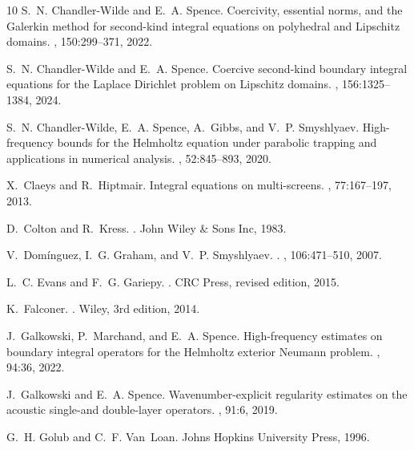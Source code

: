 \documentclass{birkjour}
\theoremstyle{definition}
\theoremstyle{remark}
\numberwithin{equation}{section}
\begin{document}
\begin{thebibliography}{10}
S.~N. Chandler-Wilde and E.~A. Spence.
\newblock Coercivity, essential norms, and the {G}alerkin method for second-kind integral equations
on polyhedral and {L}ipschitz domains.
, 150:299--371, 2022.

S.~N. Chandler-Wilde and E.~A. Spence.
\newblock Coercive second-kind boundary integral equations for the {L}aplace
  {D}irichlet problem on {L}ipschitz domains.
, 156:1325--1384, 2024.

S.~N. Chandler-Wilde, E.~A. Spence, A.~Gibbs, and V.~P. Smyshlyaev.
\newblock High-frequency bounds for the {H}elmholtz equation under parabolic
  trapping and applications in numerical analysis.
, 52:845--893, 2020.

X.~Claeys and R.~Hiptmair.
\newblock Integral equations on multi-screens.
, 77:167--197, 2013.

D.~Colton and R.~Kress.
.
\newblock John Wiley \& Sons Inc, 1983.

V.~Dom\'{i}nguez, I.~G. Graham, and V.~P. Smyshlyaev.
.
, 106:471--510, 2007.

L.~C. Evans and F.~G. Gariepy.
.
\newblock CRC Press, revised edition, 2015.

K.~Falconer.
.
\newblock Wiley, 3rd edition, 2014.

J.~Galkowski, P.~Marchand, and E.~A. Spence.
\newblock High-frequency estimates on boundary integral operators for the
  {H}elmholtz exterior {N}eumann problem.
, 94:36, 2022.

J.~Galkowski and E.~A. Spence.
\newblock Wavenumber-explicit regularity estimates on the acoustic single-and
  double-layer operators.
, 91:6, 2019.

G.~H. Golub and C.~F. Van~Loan.
\newblock Johns Hopkins University Press, 1996.


\end{thebibliography}
\end{document}
